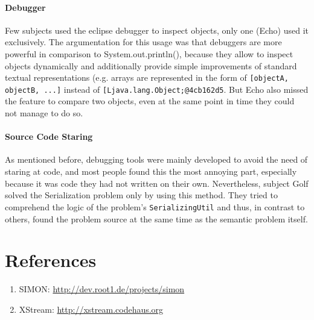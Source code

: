 \documentclass{report}
\begin{document}
\subsubsection*{Debugger}
Few subjects used the eclipse debugger to inspect objects, only one (Echo) used it exclusively. The argumentation for this usage was that debuggers are more powerful in comparison to System.out.println(), because they allow to inspect objects dynamically and additionally provide simple improvements of standard textual representations (e.g. arrays are represented in the form of \verb-[objectA, objectB, ...]- instead of \verb-[Ljava.lang.Object;@4cb162d5-. But Echo also missed the feature to compare two objects, even at the same point in time they could not manage to do so.
\subsubsection*{Source Code Staring}
As mentioned before, debugging tools were mainly developed to avoid the need of staring at code, and most people found this the most annoying part, especially because it was code they had not written on their own. Nevertheless, subject Golf solved the Serialization problem only by using this method. They tried to comprehend the logic of the problem's \verb.SerializingUtil. and thus, in contrast to others, found the problem source at the same time as the semantic problem itself.

\chapter*{References}
\begin{enumerate}
\item
SIMON: \url{http://dev.root1.de/projects/simon}
\item
XStream: \url{http://xstream.codehaus.org}
\end{enumerate}
\end{document}
